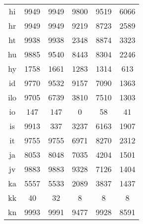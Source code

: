 \begin{figure}[h]
\begin{tabular}{cccccc}
hi&9949&9949&9800&9519&6066\\
hr&9949&9949&9219&8723&2589\\
ht&9938&9938&2348&8874&3323\\
hu&9885&9540&8443&8304&2246\\
hy&1758&1661&1283&1314&613\\
id&9770&9532&9157&7090&1363\\
ilo&9705&6739&3810&7510&1303\\
io&147&147&0&58&41\\
is&9913&337&3237&6163&1907\\
it&9755&9755&6971&8270&2312\\
ja&8053&8048&7035&4204&1501\\
jv&9883&9883&9328&7126&1404\\
ka&5557&5533&2089&3837&1437\\
kk&40&32&8&8&8\\
kn&9993&9991&9477&9928&8591\\
\end{tabular}
\end{figure}
\clearpage
